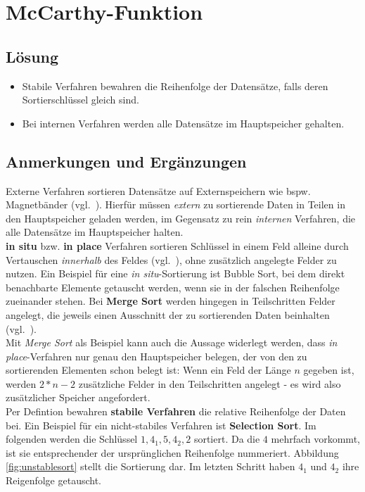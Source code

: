 \chapter{McCarthy-Funktion}

\section*{Lösung}

\begin{itemize}
    \item Stabile Verfahren bewahren die Reihenfolge der Datensätze, falls deren Sortierschlüssel gleich sind.
    \item Bei internen Verfahren werden alle Datensätze im Hauptspeicher gehalten.
\end{itemize}


\section*{Anmerkungen und Ergänzungen}

Externe Verfahren sortieren Datensätze auf Externspeichern wie bspw. Magnetbänder (vgl.~\cite[141 ff.]{OW17b}). Hierfür müssen \textit{extern} zu sortierende Daten in Teilen in den Hauptspeicher geladen werden, im Gegensatz zu rein \textit{internen} Verfahren, die alle Datensätze im Hauptspeicher halten. \\

\textbf{in situ} bzw. \textbf{in place} Verfahren sortieren Schlüssel in einem Feld alleine durch Vertauschen \textit{innerhalb} des Feldes (vgl.~\cite[169]{GD18e}), ohne zusätzlich angelegte Felder zu nutzen.
Ein Beispiel für eine \textit{in situ}-Sortierung ist Bubble Sort, bei dem direkt benachbarte Elemente getauscht werden, wenn sie in der falschen Reihenfolge zueinander stehen.
Bei \textbf{Merge Sort} werden hingegen in Teilschritten Felder angelegt, die jeweils einen Ausschnitt der zu sortierenden Daten beinhalten (vgl.~\cite[112 ff.]{OW17b}). \\

Mit \textit{Merge Sort} als Beispiel kann auch die Aussage widerlegt werden, dass \textit{in place}-Verfahren nur genau den Hauptspeicher belegen, der von den zu sortierenden Elementen schon belegt ist: Wenn ein Feld der Länge $n$ gegeben ist, werden $2 * n - 2$ zusätzliche Felder in den Teilschritten angelegt - es wird also zusätzlicher Speicher angefordert.
\\

Per Defintion bewahren \textbf{stabile Verfahren} die relative Reihenfolge der Daten bei. Ein Beispiel für ein nicht-stabiles Verfahren ist \textbf{Selection Sort}.
Im folgenden werden die Schlüssel $1, 4_1, 5, 4_2, 2$ sortiert.
Da die $4$ mehrfach vorkommt, ist sie entsprechender der ursprünglichen Reihenfolge nummeriert.
Abbildung \ref{fig:unstablesort} stellt die Sortierung dar.
Im letzten Schritt haben $4_1$ und $4_2$ ihre Reigenfolge getauscht.



